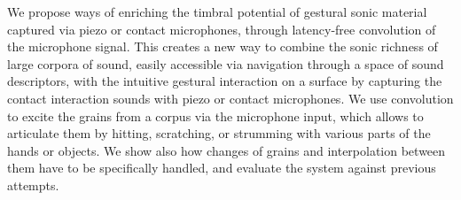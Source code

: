 We propose ways of enriching the timbral potential of gestural sonic material captured via piezo or contact microphones, through latency-free convolution of the microphone signal.
%
This creates a new way to combine the sonic richness of large corpora of sound, easily accessible via navigation through a space of sound descriptors, with the intuitive gestural interaction on a surface by capturing the contact interaction sounds with piezo or contact microphones.
%
We use convolution to excite the grains from a corpus via the microphone input, which allows to articulate them by hitting, scratching, or strumming with various parts of the hands or objects.
%
We show also how changes of grains and interpolation between them have to be specifically handled, and evaluate the system against previous attempts.
